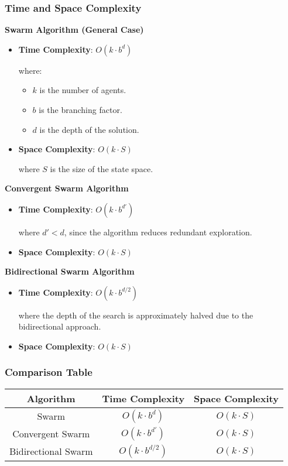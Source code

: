 \subsubsection{Time and Space Complexity}

\textbf{Swarm Algorithm (General Case)}
\begin{itemize}
    \item \textbf{Time Complexity}: \( O(k \cdot b^d) \)
    
    where:
    \begin{itemize}
        \item \( k \) is the number of agents.
        \item \( b \) is the branching factor.
        \item \( d \) is the depth of the solution.
    \end{itemize}
    \item \textbf{Space Complexity}:  \( O(k \cdot S) \)
    
    where \( S \) is the size of the state space.
\end{itemize}

\textbf{Convergent Swarm Algorithm}
\begin{itemize}
    \item \textbf{Time Complexity}: \( O(k \cdot b^{d'}) \)
    
    where \( d' < d \), since the algorithm reduces redundant exploration.
    \item \textbf{Space Complexity}: \( O(k \cdot S) \)
\end{itemize}

\textbf{Bidirectional Swarm Algorithm}
\begin{itemize}
    \item \textbf{Time Complexity}: \( O(k \cdot b^{d/2}) \)
    
    where the depth of the search is approximately halved due to the bidirectional approach.
    \item \textbf{Space Complexity}: \( O(k \cdot S) \)
\end{itemize}

\subsubsection{Comparison Table}
\begin{table}[h]
    \centering
    \begin{tabular}{|c|c|c|}
        \hline
        \textbf{Algorithm} & \textbf{Time Complexity} & \textbf{Space Complexity} \\
        \hline
        Swarm & \( O(k \cdot b^d) \) & \( O(k \cdot S) \) \\
        Convergent Swarm & \( O(k \cdot b^{d'}) \) & \( O(k \cdot S) \) \\
        Bidirectional Swarm & \( O(k \cdot b^{d/2}) \) & \( O(k \cdot S) \) \\
        \hline
    \end{tabular}
    \label{tab:swarm_complexity}
\end{table}

